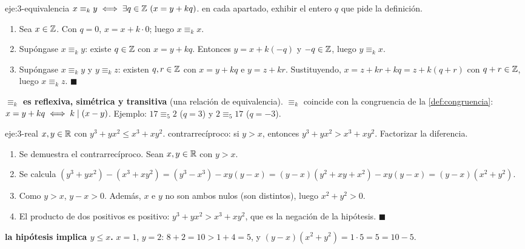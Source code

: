 \begin{solucion}{eje:3-equivalencia}
\datos $x\equiv_k y\iff\exists q\in\mathbb{Z}\ (x=y+kq)$.
\planteamiento en cada apartado, exhibir el entero $q$ que pide la definición.
\pasos
\begin{enumerate}[label=(\alph*)]
  \item Sea $x\in\mathbb{Z}$. Con $q=0$, $x=x+k\cdot 0$; luego $x\equiv_k x$.
  \item Supóngase $x\equiv_k y$: existe $q\in\mathbb{Z}$ con $x=y+kq$. Entonces $y=x+k(-q)$ y $-q\in\mathbb{Z}$, luego $y\equiv_k x$.
  \item Supóngase $x\equiv_k y$ y $y\equiv_k z$: existen $q,r\in\mathbb{Z}$ con $x=y+kq$ e $y=z+kr$. Sustituyendo, $x=z+kr+kq=z+k(q+r)$ con $q+r\in\mathbb{Z}$, luego $x\equiv_k z$. $\blacksquare$
\end{enumerate}
\resultado \textbf{$\equiv_k$ es reflexiva, simétrica y transitiva} (una relación de equivalencia).
\comprobacion $\equiv_k$ coincide con la congruencia de la \cref{def:congruencia}: $x=y+kq\iff k\mid(x-y)$. Ejemplo: $17\equiv_5 2$ ($q=3$) y $2\equiv_5 17$ ($q=-3$).
\end{solucion}

\begin{solucion}{eje:3-real}
\datos $x,y\in\mathbb{R}$ con $y^{3}+yx^{2}\le x^{3}+xy^{2}$.
\planteamiento contrarrecíproco: si $y>x$, entonces $y^{3}+yx^{2}>x^{3}+xy^{2}$. Factorizar la diferencia.
\pasos
\begin{enumerate}[label=\arabic*.]
  \item Se demuestra el contrarrecíproco. Sean $x,y\in\mathbb{R}$ con $y>x$.
  \item Se calcula $(y^{3}+yx^{2})-(x^{3}+xy^{2})=(y^{3}-x^{3})-xy(y-x)=(y-x)(y^{2}+xy+x^{2})-xy(y-x)=(y-x)(x^{2}+y^{2})$.
  \item Como $y>x$, $y-x>0$. Además, $x$ e $y$ no son ambos nulos (son distintos), luego $x^{2}+y^{2}>0$.
  \item El producto de dos positivos es positivo: $y^{3}+yx^{2}>x^{3}+xy^{2}$, que es la negación de la hipótesis. $\blacksquare$
\end{enumerate}
\resultado \textbf{la hipótesis implica $y\le x$.}
\comprobacion $x=1$, $y=2$: $8+2=10>1+4=5$, y $(y-x)(x^{2}+y^{2})=1\cdot 5=5=10-5$.
\end{solucion}

